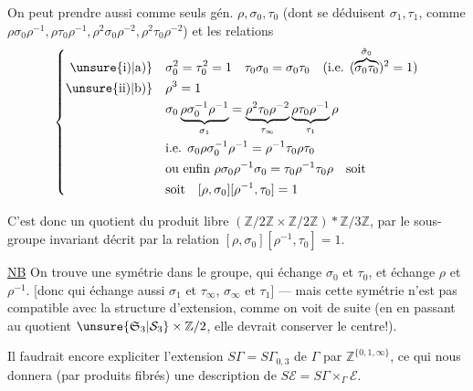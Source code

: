 
On peut prendre aussi comme seuls gén. $\rho,\sigma_0,\tau_0$ (dont se déduisent $\sigma_1,\tau_1$, \inserted{$\sigma_\infty,\tau_\infty$} comme $\rho\sigma_0\rho^{-1},\rho\tau_0\rho^{-1},\rho^2\sigma_0\rho^{-2},\rho^2\tau_0\rho^{-2}$) et les relations
\[
\left\{\begin{aligned}
\unsure{\text{i)}|\text{a)}}\quad&\sigma_0^2=\tau_0^2=1\quad\tau_0\sigma_0=\sigma_0\tau_0\quad\text{(i.e. }(\overbrace{\sigma_0\tau_0}^{\tilde\sigma_0})^2=1\text{)}\\
\unsure{\text{ii)}|\text{b)}}\quad&\rho^3=1\\
&\sigma_0\underbrace{\rho\sigma_0^{-1}\rho^{-1}}_{\sigma_1}=\underbrace{\rho^2\tau_0\rho^{-2}}_{\tau_\infty}\underbrace{\rho\tau_0\rho^{-1}}_{\tau_1}\rho\\
&\text{i.e. }\sigma_0\rho\sigma_0^{-1}\rho^{-1}=\rho^{-1}\tau_0\rho\tau_0\\
&\text{ou enfin }\rho\sigma_0\rho^{-1}\sigma_0=\tau_0\rho^{-1}\tau_0\rho\quad\text{soit}\\
&\text{soit}\quad[\rho,\sigma_0][\rho^{-1},\tau_0]=1
\end{aligned}\right.
\]

C'est donc un quotient du produit libre $(\mathbb Z/2\mathbb Z\times\mathbb Z/2\mathbb Z)*\mathbb Z/3\mathbb Z$, par le sous-groupe invariant décrit par la relation $[\rho,\sigma_0][\rho^{-1},\tau_0]=1$.

\uline{NB} On trouve une symétrie dans le groupe, qui échange $\sigma_0$ et $\tau_0$, et échange $\rho$ et $\rho^{-1}$. [donc qui échange aussi $\sigma_1$ et $\tau_\infty$, $\sigma_\infty$ et $\tau_1$] --- mais cette symétrie n'est pas compatible avec la structure d'extension, comme on voit de suite (en en passant au quotient $\unsure{\mathfrak S_3|\mathcal S_3}\times\mathbb Z/2$, elle devrait conserver le centre!).

Il faudrait encore expliciter l'extension $S\Gamma=S\Gamma_{0,3}$ de $\Gamma$ par $\mathbb Z^{\{0,1,\infty\}}$, ce qui nous donnera (par produits fibrés) une description de $S\mathcal E=S\Gamma\times_\Gamma\mathcal E$.

